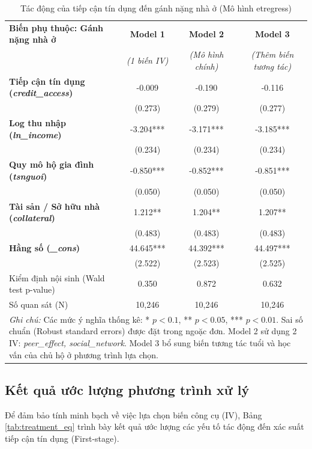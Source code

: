 \documentclass[12pt,a4paper]{report}
\begin{document}
\begin{table}[htbp]
	\centering
	\caption{Tác động của tiếp cận tín dụng đến gánh nặng nhà ở (Mô hình etregress)}
	\label{tab:etregress_results}
	\renewcommand{\arraystretch}{1.2}
	\begin{tabular}{lccc}
		\hline
		\textbf{Biến phụ thuộc: Gánh nặng nhà ở} & \textbf{Model 1} & \textbf{Model 2} & \textbf{Model 3} \\
		& \textit{(1 biến IV)} & \textit{(Mô hình chính)} & \textit{(Thêm biến tương tác)} \\
		\hline
		\textbf{Tiếp cận tín dụng (\textit{credit\_access})} & -0.009 & -0.190 & -0.116 \\
		& (0.273) & (0.279) & (0.277) \\
		\textbf{Log thu nhập (\textit{ln\_income})} & -3.204*** & -3.171*** & -3.185*** \\
		& (0.234) & (0.234) & (0.234) \\
		\textbf{Quy mô hộ gia đình (\textit{tsnguoi})} & -0.850*** & -0.852*** & -0.851*** \\
		& (0.050) & (0.050) & (0.050) \\
		\textbf{Tài sản / Sở hữu nhà (\textit{collateral})} & 1.212** & 1.204** & 1.207** \\
		& (0.483) & (0.483) & (0.483) \\
		\textbf{Hằng số (\textit{\_cons})} & 44.645*** & 44.392*** & 44.497*** \\
		& (2.522) & (2.523) & (2.525) \\
		\hline
		Kiểm định nội sinh (Wald test p-value) & 0.350 & 0.872 & 0.632 \\
		Số quan sát (N) & 10,246 & 10,246 & 10,246 \\
		\hline
		\multicolumn{4}{p{13cm}}{\footnotesize \textit{Ghi chú:} Các mức ý nghĩa thống kê: * $p < 0.1$, ** $p < 0.05$, *** $p < 0.01$. Sai số chuẩn (Robust standard errors) được đặt trong ngoặc đơn. Model 2 sử dụng 2 IV: \textit{peer\_effect, social\_network}. Model 3 bổ sung biến tương tác tuổi và học vấn của chủ hộ ở phương trình lựa chọn.} \\
	\end{tabular}
\end{table}

\subsection{Kết quả ước lượng phương trình xử lý}

Để đảm bảo tính minh bạch về việc lựa chọn biến công cụ (IV), Bảng \ref{tab:treatment_eq} trình bày kết quả ước lượng các yếu tố tác động đến xác suất tiếp cận tín dụng (First-stage).
\end{document}
